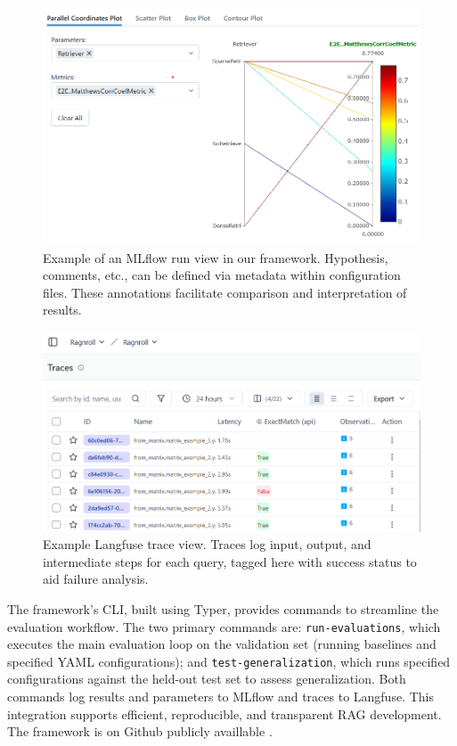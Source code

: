 \begin{figure}
  \centering
  \includegraphics[width=\textwidth]{images/MLFlow-Vis.png}
  \caption{Example of an MLflow run view in our framework. Hypothesis, comments, etc., can be defined via metadata within configuration files. These annotations facilitate comparison and interpretation of results.}
  \label{fig:mlflow}
\end{figure}

\begin{figure}
\centering
\includegraphics[width=\textwidth]{images/langfuse.png}
\caption{Example Langfuse trace view. Traces log input, output, and intermediate steps for each query, tagged here with success status to aid failure analysis.}
\label{fig:langfuse}
\end{figure}

The framework's CLI, built using Typer, provides commands to streamline the evaluation workflow. The two primary commands are: \texttt{run-evaluations}, which executes the main evaluation loop on the validation set (running baselines and specified YAML configurations); and \texttt{test-generalization}, which runs specified configurations against the held-out test set to assess generalization. Both commands log results and parameters to MLflow and traces to Langfuse. This integration supports efficient, reproducible, and transparent RAG development. The framework is on Github publicly availlable \cite{albrecht-2025}.

